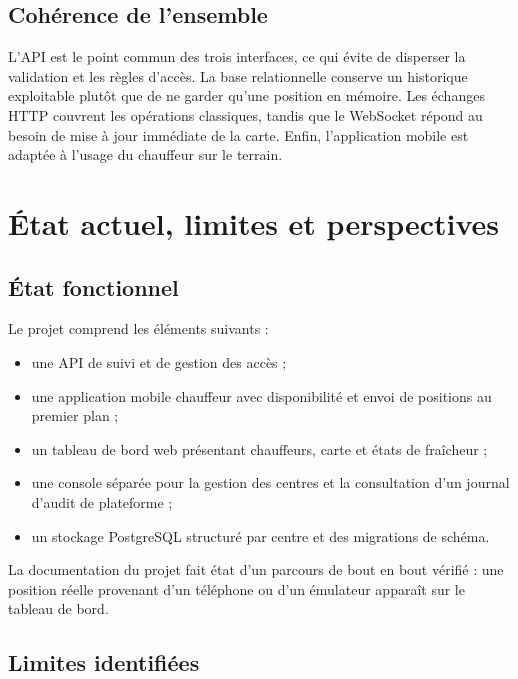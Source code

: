 \documentclass[11pt,a4paper,oneside]{report}
\begin{document}
\section{Cohérence de l'ensemble}

L'API est le point commun des trois interfaces, ce qui évite de disperser la
validation et les règles d'accès. La base relationnelle conserve un historique
exploitable plutôt que de ne garder qu'une position en mémoire. Les échanges
HTTP couvrent les opérations classiques, tandis que le WebSocket répond au
besoin de mise à jour immédiate de la carte. Enfin, l'application mobile est
adaptée à l'usage du chauffeur sur le terrain.

\chapter{État actuel, limites et perspectives}

\section{État fonctionnel}

Le projet comprend les éléments suivants :
\begin{itemize}
  \item une API de suivi et de gestion des accès ;
  \item une application mobile chauffeur avec disponibilité et envoi de
        positions au premier plan ;
  \item un tableau de bord web présentant chauffeurs, carte et états de
        fraîcheur ;
  \item une console séparée pour la gestion des centres et la consultation
        d'un journal d'audit de plateforme ;
  \item un stockage PostgreSQL structuré par centre et des migrations de
        schéma.
\end{itemize}

La documentation du projet fait état d'un parcours de bout en bout vérifié :
une position réelle provenant d'un téléphone ou d'un émulateur apparaît sur
le tableau de bord.

\section{Limites identifiées}
\end{document}
